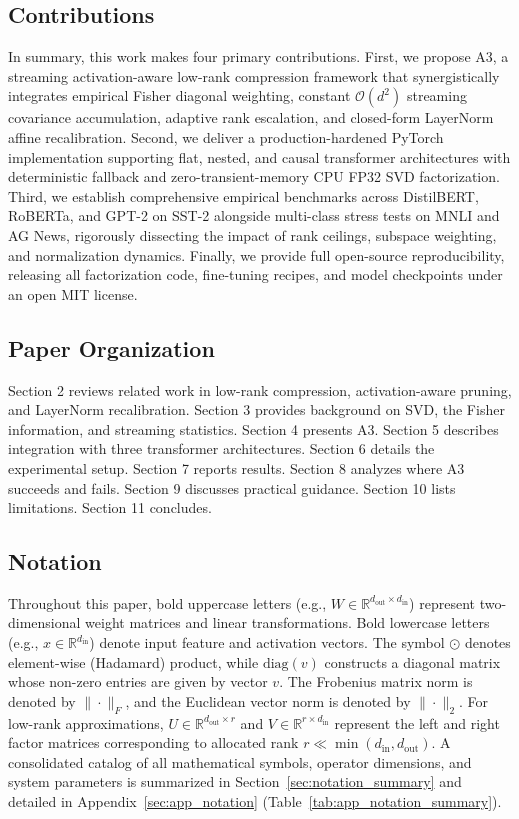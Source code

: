 \subsection{Contributions}

In summary, this work makes four primary contributions. First, we propose A3, a streaming activation-aware low-rank compression framework that synergistically integrates empirical Fisher diagonal weighting, constant $\mathcal{O}(d^2)$ streaming covariance accumulation, adaptive rank escalation, and closed-form LayerNorm affine recalibration. Second, we deliver a production-hardened PyTorch implementation supporting flat, nested, and causal transformer architectures with deterministic fallback and zero-transient-memory CPU FP32 SVD factorization. Third, we establish comprehensive empirical benchmarks across DistilBERT, RoBERTa, and GPT-2 on SST-2 alongside multi-class stress tests on MNLI and AG News, rigorously dissecting the impact of rank ceilings, subspace weighting, and normalization dynamics. Finally, we provide full open-source reproducibility, releasing all factorization code, fine-tuning recipes, and model checkpoints under an open MIT license.
\subsection{Paper Organization}

Section 2 reviews related work in low-rank compression, activation-aware 
pruning, and LayerNorm recalibration. Section 3 provides background on SVD, 
the Fisher information, and streaming statistics. Section 4 presents A3. 
Section 5 describes integration with three transformer architectures. Section 
6 details the experimental setup. Section 7 reports results. Section 8 
analyzes where A3 succeeds and fails. Section 9 discusses practical guidance. 
Section 10 lists limitations. Section 11 concludes.



\subsection{Notation}
\label{sec:notation}

Throughout this paper, bold uppercase letters (e.g., $W \in \mathbb{R}^{d_{\mathrm{out}} \times d_{\mathrm{in}}}$) represent two-dimensional weight matrices and linear transformations. Bold lowercase letters (e.g., $x \in \mathbb{R}^{d_{\mathrm{in}}}$) denote input feature and activation vectors. The symbol $\odot$ denotes element-wise (Hadamard) product, while $\mathrm{diag}(v)$ constructs a diagonal matrix whose non-zero entries are given by vector $v$. The Frobenius matrix norm is denoted by $\|\cdot\|_F$, and the Euclidean vector norm is denoted by $\|\cdot\|_2$. For low-rank approximations, $U \in \mathbb{R}^{d_{\mathrm{out}} \times r}$ and $V \in \mathbb{R}^{r \times d_{\mathrm{in}}}$ represent the left and right factor matrices corresponding to allocated rank $r \ll \min(d_{\mathrm{in}}, d_{\mathrm{out}})$. A consolidated catalog of all mathematical symbols, operator dimensions, and system parameters is summarized in Section~\ref{sec:notation_summary} and detailed in Appendix~\ref{sec:app_notation} (Table~\ref{tab:app_notation_summary}).

